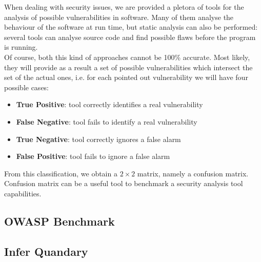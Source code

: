 \documentclass[../Report.tex]{subfiles}
\begin{document}
When dealing with security issues, we are provided a pletora of tools for the analysis of possible vulnerabilities in software. Many of them analyse the behaviour of the software at run time, but static analysis can also be performed: several tools can analyse source code and find possible flaws before the program is running. \\
Of course, both this kind of approaches cannot be 100\% accurate. Most likely, they will provide as a result a set of possible vulnerabilities which intersect the set of the actual ones, i.e. for each pointed out vulnerability we will have four possible cases:

\begin{itemize}
	\item \textbf{True Positive}: tool correctly identifies a real vulnerability
	\item \textbf{False Negative}: tool fails to identify a real vulnerability
	\item \textbf{True Negative}: tool correctly ignores a false alarm
	\item \textbf{False Positive}: tool fails to ignore a false alarm
\end{itemize}

From this classification, we obtain a $2 \times 2$ matrix, namely a confusion matrix. Confusion matrix can be a useful tool to benchmark a security analysis tool capabilities. \\

\subsection{OWASP Benchmark}\label{sub:owasp}



\subsection{Infer Quandary}\label{sub:infer}


\end{document}
